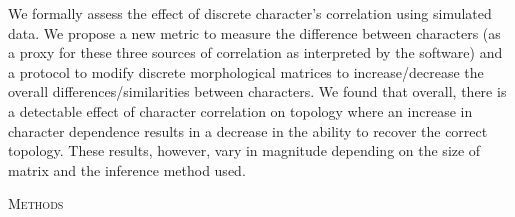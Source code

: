 \documentclass[12pt,letterpaper]{article}
\renewcommand{\section}[1]{%
\bigskip
\begin{center}
\begin{Large}
\normalfont\scshape #1
\medskip
\end{Large}
\end{center}}
\begin{document}
We formally assess the effect of discrete character's correlation using simulated data.
We propose a new metric to measure the difference between characters (as a proxy for these three sources of correlation as interpreted by the software) and a protocol to modify discrete morphological matrices to increase/decrease the overall differences/similarities between characters.
We found that overall, there is a detectable effect of character correlation on topology where an increase in character dependence results in a decrease in the ability to recover the correct topology.
These results, however, vary in magnitude depending on the size of matrix and the inference method used.

\section{Methods}
\end{document}
